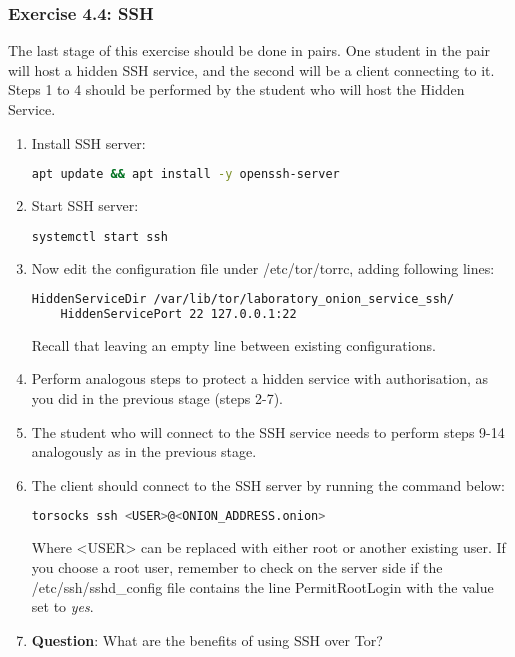 \subsubsection{Exercise 4.4: SSH}
The last stage of this exercise should be done in pairs. One student in the pair will host a hidden SSH service, and the second will be a client connecting to it. Steps 1 to 4 should be performed by the student who will host the Hidden Service.

\begin{enumerate}
    \item Install SSH server:
    \begin{lstlisting}[language=bash]
    apt update && apt install -y openssh-server
    \end{lstlisting}
    \item Start SSH server:
    \begin{lstlisting}[language=bash]
    systemctl start ssh
    \end{lstlisting}
    \item Now edit the configuration file under /etc/tor/torrc, adding following lines:
    \begin{lstlisting}[language=bash]
    HiddenServiceDir /var/lib/tor/laboratory_onion_service_ssh/
    HiddenServicePort 22 127.0.0.1:22
    \end{lstlisting}
    Recall that leaving an empty line between existing configurations.
    \item Perform analogous steps to protect a hidden service with authorisation, as you did in the previous stage (steps 2-7).
    \item The student who will connect to the SSH service needs to perform steps 9-14 analogously as in the previous stage.
    \item The client should connect to the SSH server by running the command below:
    \begin{lstlisting}[language=bash]
    torsocks ssh <USER>@<ONION_ADDRESS.onion>
    \end{lstlisting}
    Where <USER> can be replaced with either root or another existing user. If you choose a root user, remember to check on the server side if the /etc/ssh/sshd\_config file contains the line PermitRootLogin with the value set to \textit{yes}.
    \item \textbf{Question}: What are the benefits of using SSH over Tor?
\end{enumerate}

